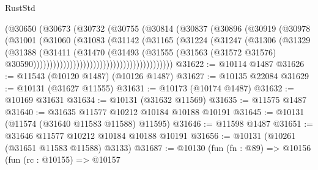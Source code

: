 \begin{lexlean}{RustStd}
\begin{coremodule}
                                        (@30650
                                          (@30673
                                            (@30732
                                              (@30755
                                                (@30814
                                                  (@30837
                                                    (@30896
                                                      (@30919
                                                        (@30978
                                                          (@31001
                                                            (@31060
                                                              (@31083
                                                                (@31142
                                                                  (@31165
                                                                    (@31224
                                                                      (@31247
                                                                        (@31306
                                                                          (@31329
                                                                            (@31388
                                                                              (@31411
                                                                                (@31470
                                                                                  (@31493
                                                                                    (@31555
                                                                                      (@31563
                                                                                        (@31572
                                                                                          @31576)
                                                                                        @30590))))))))))))))))))))))))))))))))))))))))))
@31622 := @10114 @1487
@31626 := @11543 (@10120 @1487) (@10126 @1487)
@31627 := @10135 @22084
@31629 := @10131 (@31627 @11555)
@31631 := @10173 (@10174 @1487)
@31632 := @10169 @31631
@31634 := @10131 (@31632 @11569)
@31635 := @11575 @1487
@31640 := @31635 @11577 @10212 @10184 @10188 @10191
@31645 := @10131 (@11574 (@31640 @11583 @11588) @11595)
@31646 := @11598 @1487
@31651 := @31646 @11577 @10212 @10184 @10188 @10191
@31656 := @10131 (@10261 (@31651 @11583 @11588) @3133)
@31687 := @10130
    (fun (fn : @89) =>
    @10156
      (fun (rc : @10155) =>
      @10157

\end{coremodule}
\end{lexlean}
